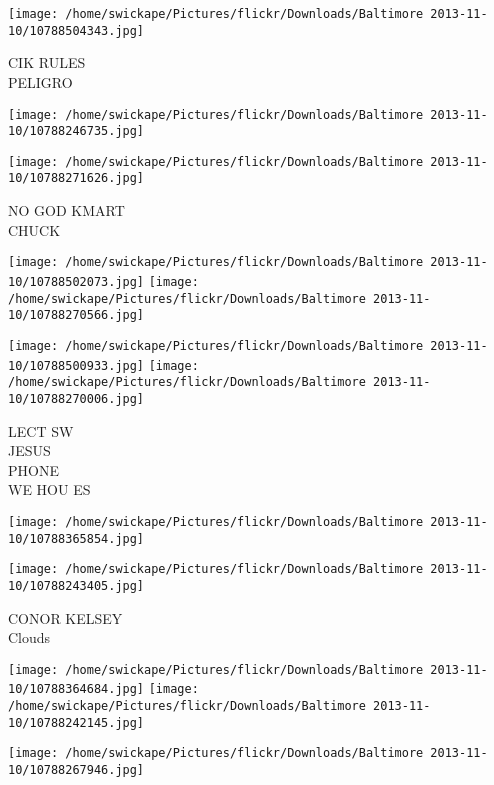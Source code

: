 \documentclass[10pt,letterpaper]{article}
\begin{document}
\vspace{0.25in}
\texttt{[image: /home/swickape/Pictures/flickr/Downloads/Baltimore 2013-11-10/10788504343.jpg]}

CIK RULES\\
PELIGRO\\
\pagebreak

\texttt{[image: /home/swickape/Pictures/flickr/Downloads/Baltimore 2013-11-10/10788246735.jpg]}

\vspace{0.25in}
\texttt{[image: /home/swickape/Pictures/flickr/Downloads/Baltimore 2013-11-10/10788271626.jpg]}

NO GOD KMART\\
CHUCK\\
\pagebreak

\texttt{[image: /home/swickape/Pictures/flickr/Downloads/Baltimore 2013-11-10/10788502073.jpg]}
\texttt{[image: /home/swickape/Pictures/flickr/Downloads/Baltimore 2013-11-10/10788270566.jpg]}

\texttt{[image: /home/swickape/Pictures/flickr/Downloads/Baltimore 2013-11-10/10788500933.jpg]}
\texttt{[image: /home/swickape/Pictures/flickr/Downloads/Baltimore 2013-11-10/10788270006.jpg]}

LECT SW\\
JESUS\\
PHONE\\
WE HOU ES\\
\pagebreak

\texttt{[image: /home/swickape/Pictures/flickr/Downloads/Baltimore 2013-11-10/10788365854.jpg]}

\vspace{0.25in}
\texttt{[image: /home/swickape/Pictures/flickr/Downloads/Baltimore 2013-11-10/10788243405.jpg]}

CONOR KELSEY\\
Clouds\\
\pagebreak

\texttt{[image: /home/swickape/Pictures/flickr/Downloads/Baltimore 2013-11-10/10788364684.jpg]}
\texttt{[image: /home/swickape/Pictures/flickr/Downloads/Baltimore 2013-11-10/10788242145.jpg]}

\vspace{0.25in}
\texttt{[image: /home/swickape/Pictures/flickr/Downloads/Baltimore 2013-11-10/10788267946.jpg]}
\end{document}
